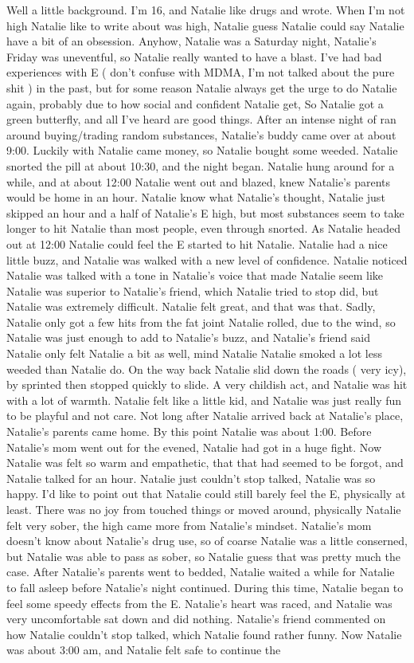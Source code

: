 \documentclass[12pt]{book}
\begin{document}
Well a little background. I'm 16, and Natalie like drugs and wrote. When I'm not high Natalie like to write about was high, Natalie guess Natalie could say Natalie have a bit of an obsession. Anyhow, Natalie was a Saturday night, Natalie's Friday was uneventful, so Natalie really wanted to have a blast. I've had bad experiences with E ( don't confuse with MDMA, I'm not talked about the pure shit ) in the past, but for some reason Natalie always get the urge to do Natalie again, probably due to how social and confident Natalie get, So Natalie got a green butterfly, and all I've heard are good things. After an intense night of ran around buying/trading random substances, Natalie's buddy came over at about 9:00. Luckily with Natalie came money, so Natalie bought some weeded. Natalie snorted the pill at about 10:30, and the night began. Natalie hung around for a while, and at about 12:00 Natalie went out and blazed, knew Natalie's parents would be home in an hour. Natalie know what Natalie's thought, Natalie just skipped an hour and a half of Natalie's E high, but most substances seem to take longer to hit Natalie than most people, even through snorted. As Natalie headed out at 12:00 Natalie could feel the E started to hit Natalie. Natalie had a nice little buzz, and Natalie was walked with a new level of confidence. Natalie noticed Natalie was talked with a tone in Natalie's voice that made Natalie seem like Natalie was superior to Natalie's friend, which Natalie tried to stop did, but Natalie was extremely difficult. Natalie felt great, and that was that. Sadly, Natalie only got a few hits from the fat joint Natalie rolled, due to the wind, so Natalie was just enough to add to Natalie's buzz, and Natalie's friend said Natalie only felt Natalie a bit as well, mind Natalie Natalie smoked a lot less weeded than Natalie do. On the way back Natalie slid down the roads ( very icy), by sprinted then stopped quickly to slide. A very childish act, and Natalie was hit with a lot of warmth. Natalie felt like a little kid, and Natalie was just really fun to be playful and not care. Not long after Natalie arrived back at Natalie's place, Natalie's parents came home. By this point Natalie was about 1:00. Before Natalie's mom went out for the evened, Natalie had got in a huge fight. Now Natalie was felt so warm and empathetic, that that had seemed to be forgot, and Natalie talked for an hour. Natalie just couldn't stop talked, Natalie was so happy. I'd like to point out that Natalie could still barely feel the E, physically at least. There was no joy from touched things or moved around, physically Natalie felt very sober, the high came more from Natalie's mindset. Natalie's mom doesn't know about Natalie's drug use, so of coarse Natalie was a little conserned, but Natalie was able to pass as sober, so Natalie guess that was pretty much the case. After Natalie's parents went to bedded, Natalie waited a while for Natalie to fall asleep before Natalie's night continued. During this time, Natalie began to feel some speedy effects from the E. Natalie's heart was raced, and Natalie was very uncomfortable sat down and did nothing. Natalie's friend commented on how Natalie couldn't stop talked, which Natalie found rather funny. Now Natalie was about 3:00 am, and Natalie felt safe to continue the 
\end{document}
